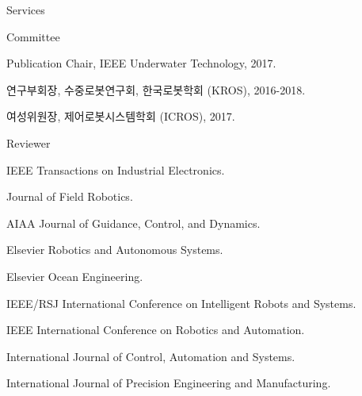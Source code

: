 \begin{rSection}{Services}


\begin{rSubsection}{Committee}{}{}{}
  \item Publication Chair, IEEE Underwater Technology, 2017.
  \item 연구부회장, 수중로봇연구회, 한국로봇학회 (KROS), 2016-2018.
  \item 여성위원장, 제어로봇시스템학회 (ICROS), 2017.
\end{rSubsection}

\begin{rSubsection}{Reviewer}{}{}{}
  \item IEEE Transactions on Industrial Electronics.
  \item Journal of Field Robotics.
  \item AIAA Journal of Guidance, Control, and Dynamics.
  \item Elsevier Robotics and Autonomous Systems.
  \item Elsevier Ocean Engineering.
  \item IEEE/RSJ International Conference on Intelligent Robots and Systems.
  \item IEEE International Conference on Robotics and Automation.
  \item International Journal of Control, Automation and Systems.
  \item International Journal of Precision Engineering and Manufacturing.
\end{rSubsection}

\end{rSection}

